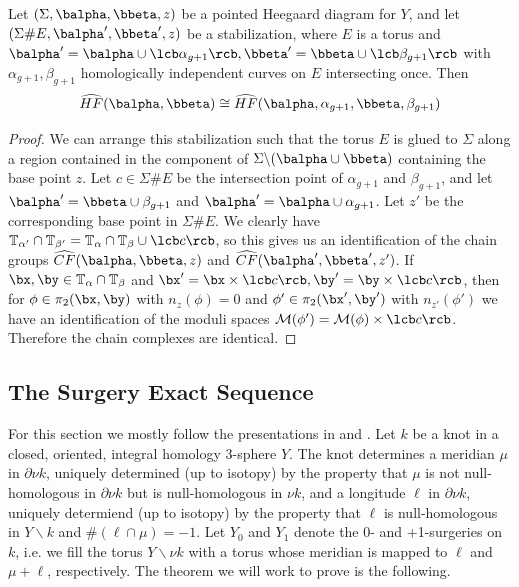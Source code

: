 \begin{thm}
Let $(\Sigma,\balpha,\bbeta,z)$ be a pointed Heegaard diagram for $Y$, and let $(\Sigma \# E,\balpha',\bbeta',z)$ be a stabilization, where $E$ is a torus and $\balpha'=\balpha \cup \lcb \alpha_{g+1} \rcb, \bbeta' = \bbeta \cup \lcb \beta_{g+1} \rcb$ with $\alpha_{g+1},\beta_{g+1}$ homologically independent curves on $E$ intersecting once. Then
\[ \widehat{HF}(\balpha,\bbeta) \cong \widehat{HF}(\balpha,\alpha_{g+1},\bbeta,\beta_{g+1}) \]
\end{thm}
\begin{proof}
We can arrange this stabilization such that the torus $E$ is glued to $\Sigma$ along a region contained in the component of $\Sigma \backslash (\balpha \cup \bbeta)$ containing the base point $z$. Let $c \in \Sigma \# E$ be the intersection point of $\alpha_{g+1}$ and $\beta_{g+1}$, and let $\balpha'=\bbeta\cup\beta_{g+1}$ and $\balpha'=\balpha\cup\alpha_{g+1}$. Let $z'$ be the corresponding base point in $\Sigma \# E$. We clearly have $\mathbb T_{\alpha'} \cap \mathbb T_{\beta'} = \mathbb T_\alpha \cap \mathbb T_\beta \cup \lcb c \rcb$, so this gives us an identification of the chain groups $\widehat{CF}(\balpha,\bbeta,z)$ and $\widehat{CF}(\balpha',\bbeta',z')$. If $\bx,\by \in \mathbb T_\alpha \cap \mathbb T_\beta$ and $\bx'=\bx \times \lcb c \rcb,\by'=\by\times\lcb c\rcb$, then for $\phi \in \pi_2(\bx,\by)$ with $n_z(\phi)=0$ and $\phi' \in \pi_2(\bx',\by')$ with $n_{z'}(\phi')$ we have an identification of the moduli spaces $\mathcal M(\phi') = \mathcal M(\phi) \times \lcb c \rcb$. Therefore the chain complexes are identical.
\end{proof}










\subsection{The Surgery Exact Sequence}
\label{The Surgery Exact Sequence}


For this section we mostly follow the presentations in \cite{hf-branched-double-covers} and \cite{lectures-heegaard-floer}. Let $k$ be a knot in a closed, oriented, integral homology 3-sphere $Y$. The knot determines a meridian $\mu$ in $\partial \nu k$, uniquely determined (up to isotopy) by the property that $\mu$ is not null-homologous in $\partial \nu k$ but is null-homologous in $\nu k$, and a longitude $\ell$ in $\partial \nu k$, uniquely determiend (up to isotopy) by the property that $\ell$ is null-homologous in $Y \backslash k$ and $\#(\ell \cap \mu)=-1$. Let $Y_0$ and $Y_1$ denote the 0- and +1-surgeries on $k$, i.e. we fill the torus $Y \backslash \nu k$ with a torus whose meridian is mapped to $\ell$ and $\mu+\ell$, respectively. The theorem we will work to prove is the following.

